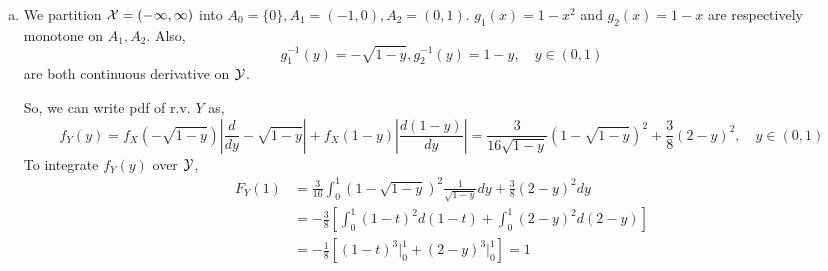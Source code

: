 \documentclass[letter]{article}
\newcommand{\cX}{\cal{X}}
\newcommand{\cY}{\cal{Y}}
\begin{document}
\begin{enumerate}[(a)]
    \item We partition $\cX = (-1, 1)$ into 
    $A_0 = \{0\}, A_1 = (-1, 0), A_2 = (0,1)$. $g_1(x) = 1-x^2$ and 
    $g_2(x) = 1-x$ are respectively monotone on $A_1, A_2$. 
    Also,
    \[
    g^{-1}_1(y) = -\sqrt{1-y}, g^{-1}_2(y) = 1-y, \quad y \in (0,1)
    \]
    are both continuous derivative on $\cY$. 
    
    So, we can write pdf of r.v. $Y$ as,
    \[
    f_Y(y) = f_X(-\sqrt{1-y})\left|\frac{d}{dy} -\sqrt{1-y}\right|
    + f_X(1-y)\left|\frac{d(1-y)}{dy}\right| =
    \frac{3}{16\sqrt{1-y}}(1-\sqrt{1-y})^2 + \frac{3}{8}(2-y)^2, \quad y \in (0,1)
    \]
    To integrate $f_Y(y)$ over $\cY$,
    \begin{align*}
    F_Y(1) & = \frac{3}{16}\int_0^1 (1-\sqrt{1-y})^2\frac{1}{\sqrt{1-y}} dy 
    + \frac{3}{8} (2-y)^2 dy \\
    & = -\frac{3}{8} \left[\int_0^1 (1-t)^2 d(1-t) + \int_0^1 (2-y)^2
    d(2-y)\right] \\
    & = -\frac{1}{8} \left[ (1-t)^3 \rvert^1_0 + (2-y)^3\rvert^1_0\right]
    = 1
    \end{align*}
    \end{enumerate}
\end{document}
